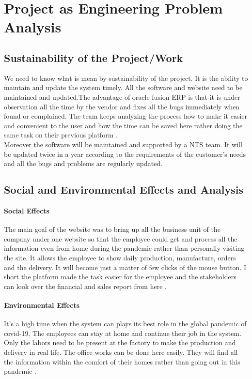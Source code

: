 \chapter{Project as Engineering Problem Analysis}

\section{Sustainability of the Project/Work}

We need to know what is mean by sustainability of the project. It is the ability to maintain and update the system timely. All the software and website need to be maintained and updated.The advantage of oracle fusion ERP is that it is under observation all the time by the vendor and fixes all the bugs immediately when found or complained. The team keeps analyzing the process how to make it easier and convenient to the user and how the time can be saved here rather doing the same task on their previous platform \cite{frazee2012erp}. \\[4ex]
	Moreover the software will be maintained and supported by a NTS team. It will be updated twice in a year according to the requirements of the customer’s needs and all the bugs and problems are regularly updated. \\[4ex]


\section{Social and Environmental Effects and Analysis}
\subsubsection{Social Effects} The main goal of the website was to bring up all the business unit of the company under one website so that the employee could get and process all the information even from home during the pandemic rather than personally visiting the site. It allows the employee to show daily production, manufacture, orders and the delivery. It will become just a matter of few clicks of the mouse button. I short the platform made the task easier for the employee and the stakeholders can look over the financial and sales report from here \cite{niedeggen2014there}. \\[4ex]
\subsubsection{Environmental Effects}
	It’s a high time when the system can plays its best role in the global pandemic of covid-19. The employees can stay at home and continue their job in the system. Only the labors need to be present at the factory to make the production and delivery in real life. The office works can be done here easily. They will find all the information within the comfort of their homes rather than going out in this pandemic \cite{lai2016technology}. \\[4ex]


